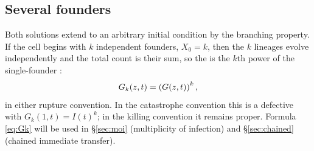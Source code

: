 \subsection{Several founders}
\label{sec:pgf-k-founders}

Both solutions extend to an arbitrary initial condition by the branching
property. If the cell begins with $k$ independent founders, $X_0=k$, then the
$k$ lineages evolve independently and the total count is their sum, so the
\pgf{} is the $k$th power of the single-founder \pgf:
\begin{equation}
G_k(z,t) = \left( G(z,t)\right)^k,
\label{eq:Gk}
\end{equation}
in either rupture convention. In the catastrophe convention this is a
defective \pgf{} with $G_k(1,t)=I(t)^k$; in the killing convention it
remains proper. Formula \eqref{eq:Gk} will be used in \S\ref{sec:moi}
(multiplicity of infection) and \S\ref{sec:chained} (chained immediate
transfer).
